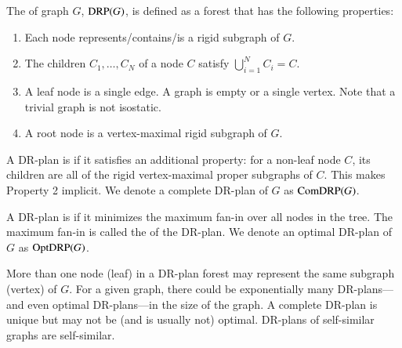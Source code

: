\begin{definition}\label{def:drp}
    The  \cite{hoffman2001decompositionI} of graph $G$, $\text{DRP}(G)$, is defined as a forest that has the following properties:
    \begin{enumerate}
        \item Each node represents/contains/is a rigid subgraph of $G$.
        \item The children $C_1,\ldots,C_N$ of a node $C$ satisfy $\bigcup_{i=1}^N{C_i}=C$.
        \item A leaf node is a single edge. A  graph is empty or a single vertex. Note that a trivial graph is not isostatic.
        \item A root node is a vertex-maximal rigid subgraph of $G$.
    \end{enumerate}
%
%
    A DR-plan is  if it satisfies an additional property: for a non-leaf node $C$, its children are all of the rigid vertex-maximal proper subgraphs of $C$. This makes Property 2 implicit.
  We denote a complete DR-plan of $G$ as $\text{ComDRP}(G)$.

  A DR-plan is  if it minimizes the maximum fan-in over all nodes in the tree. The maximum  fan-in is called the  of the DR-plan. We denote an optimal DR-plan of $G$ as $\text{OptDRP}(G)$.
%
\end{definition}
%
\begin{remark}
More than one node (leaf) in a DR-plan forest may represent the same subgraph (vertex) of $G$.
For a given graph, there could be exponentially many DR-plans---and even optimal DR-plans---in the size of the graph. A complete DR-plan is unique but may not be (and is usually not) optimal. DR-plans of self-similar graphs are self-similar.
\end{remark}

